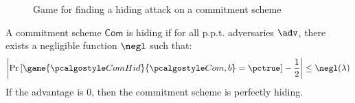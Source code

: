 
\begin{figure}[tbhp]
  \begin{center}
    \begin{tcolorbox}[width=8cm]
      \begin{pchstack}[center]
      \end{pchstack}
    \end{tcolorbox}
  \end{center}
  \caption{Game for finding a hiding attack on a commitment scheme \label{fig:break-com-hid}}
\end{figure}

A commitment scheme $\mathsf{Com}$ is hiding if for all p.p.t. adversaries $\adv$, there exists a negligible function $\negl$ such that:
\[ \left| \pr{\game{\algo{ComHid}}{\algo{Com}, b} = \pctrue} - \frac{1}{2} \right| \leq \negl(\lambda) \]
If the advantage is 0, then the commitment scheme is perfectly hiding.

